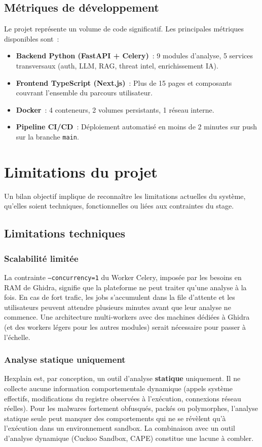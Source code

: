 \subsection{Métriques de développement}

Le projet représente un volume de code significatif. Les principales métriques disponibles sont~:

\begin{itemize}
  \item \textbf{Backend Python (FastAPI + Celery)}~: 9 modules d'analyse, 5 services transversaux (auth, LLM, RAG, threat intel, enrichissement IA).
  \item \textbf{Frontend TypeScript (Next.js)}~: Plus de 15 pages et composants couvrant l'ensemble du parcours utilisateur.
  \item \textbf{Docker}~: 4 conteneurs, 2 volumes persistants, 1 réseau interne.
  \item \textbf{Pipeline CI/CD}~: Déploiement automatisé en moins de 2 minutes sur push sur la branche \texttt{main}.
\end{itemize}

\section{Limitations du projet}

Un bilan objectif implique de reconnaître les limitations actuelles du système, qu'elles soient techniques, fonctionnelles ou liées aux contraintes du stage.

\subsection{Limitations techniques}

\subsubsection{Scalabilité limitée}
La contrainte \texttt{--concurrency=1} du Worker Celery, imposée par les besoins en RAM de Ghidra, signifie que la plateforme ne peut traiter qu'une analyse à la fois. En cas de fort trafic, les jobs s'accumulent dans la file d'attente et les utilisateurs peuvent attendre plusieurs minutes avant que leur analyse ne commence. Une architecture multi-workers avec des machines dédiées à Ghidra (et des workers légers pour les autres modules) serait nécessaire pour passer à l'échelle.

\subsubsection{Analyse statique uniquement}
Hexplain est, par conception, un outil d'analyse \textbf{statique} uniquement. Il ne collecte aucune information comportementale dynamique (appels système effectifs, modifications du registre observées à l'exécution, connexions réseau réelles). Pour les malwares fortement obfusqués, packés ou polymorphes, l'analyse statique seule peut manquer des comportements qui ne se révèlent qu'à l'exécution dans un environnement sandbox. La combinaison avec un outil d'analyse dynamique (Cuckoo Sandbox, CAPE) constitue une lacune à combler.

